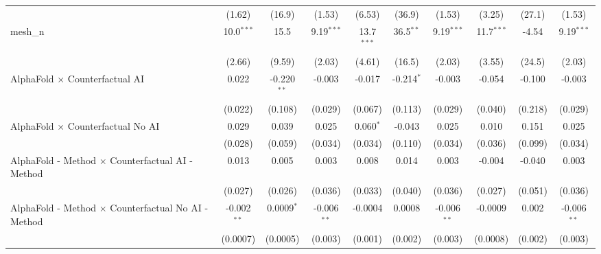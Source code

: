 \begin{tabular}{lccccccccc}
                                                               & (1.62)        & (16.9)         & (1.53)        & (6.53)        & (36.9)        & (1.53)        & (3.25)        & (27.1)         & (1.53)\\   
   mesh\_n                                                     & 10.0$^{***}$  & 15.5           & 9.19$^{***}$  & 13.7$^{***}$  & 36.5$^{**}$   & 9.19$^{***}$  & 11.7$^{***}$  & -4.54          & 9.19$^{***}$\\   
                                                               & (2.66)        & (9.59)         & (2.03)        & (4.61)        & (16.5)        & (2.03)        & (3.55)        & (24.5)         & (2.03)\\   
   AlphaFold $\times$ Counterfactual AI                        & 0.022         & -0.220$^{**}$  & -0.003        & -0.017        & -0.214$^{*}$  & -0.003        & -0.054        & -0.100         & -0.003\\   
                                                               & (0.022)       & (0.108)        & (0.029)       & (0.067)       & (0.113)       & (0.029)       & (0.040)       & (0.218)        & (0.029)\\   
   AlphaFold $\times$ Counterfactual No AI                     & 0.029         & 0.039          & 0.025         & 0.060$^{*}$   & -0.043        & 0.025         & 0.010         & 0.151          & 0.025\\   
                                                               & (0.028)       & (0.059)        & (0.034)       & (0.034)       & (0.110)       & (0.034)       & (0.036)       & (0.099)        & (0.034)\\   
   AlphaFold - Method $\times$ Counterfactual AI - Method      & 0.013         & 0.005          & 0.003         & 0.008         & 0.014         & 0.003         & -0.004        & -0.040         & 0.003\\   
                                                               & (0.027)       & (0.026)        & (0.036)       & (0.033)       & (0.040)       & (0.036)       & (0.027)       & (0.051)        & (0.036)\\   
   AlphaFold - Method $\times$ Counterfactual No AI - Method   & -0.002$^{**}$ & 0.0009$^{*}$   & -0.006$^{**}$ & -0.0004       & 0.0008        & -0.006$^{**}$ & -0.0009       & 0.002          & -0.006$^{**}$\\   
                                                               & (0.0007)      & (0.0005)       & (0.003)       & (0.001)       & (0.002)       & (0.003)       & (0.0008)      & (0.002)        & (0.003)\\   

\end{tabular}
